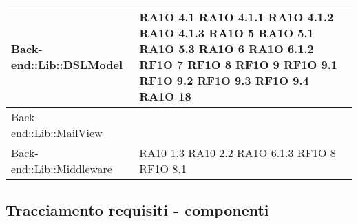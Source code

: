 \begin{center}
\begin{longtable}{|p{5cm}|p{3cm}|}
			Back-end::Lib::DSLModel & RA1O 4.1 \newline RA1O 4.1.1 \newline RA1O 4.1.2 \newline  RA1O 4.1.3 \newline
			RA1O 5 \newline RA1O 5.1 \newline RA1O 5.3 \newline RA1O 6 \newline RA1O 6.1.2 \newline RF1O 7 \newline RF1O 8 \newline		
			RF1O 9 \newline	RF1O 9.1 \newline RF1O 9.2 \newline RF1O 9.3 \newline	RF1O 9.4 \newline RA1O 18 \newline	
			\\ \hline
			
			
			Back-end::Lib::MailView & 		\\ \hline
			
			Back-end::Lib::Middleware & RA10 1.3 \newline RA10 2.2 \newline RA1O 6.1.3 \newline RF1O 8 \newline RF1O 8.1 \newline		\\ \hline

   \end{longtable}
      \egroup
      \end{center}  
\clearpage

\subsection{Tracciamento requisiti - componenti}

